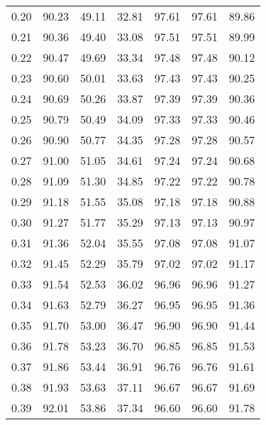 \begin{tabular}{|c|c|c|c|c|c|c|}
      0.20 &     90.23 &     49.11 &      32.81 &   97.61 &      97.61 &         89.86 \\
      0.21 &     90.36 &     49.40 &      33.08 &   97.51 &      97.51 &         89.99 \\
      0.22 &     90.47 &     49.69 &      33.34 &   97.48 &      97.48 &         90.12 \\
      0.23 &     90.60 &     50.01 &      33.63 &   97.43 &      97.43 &         90.25 \\
      0.24 &     90.69 &     50.26 &      33.87 &   97.39 &      97.39 &         90.36 \\
      0.25 &     90.79 &     50.49 &      34.09 &   97.33 &      97.33 &         90.46 \\
      0.26 &     90.90 &     50.77 &      34.35 &   97.28 &      97.28 &         90.57 \\
      0.27 &     91.00 &     51.05 &      34.61 &   97.24 &      97.24 &         90.68 \\
      0.28 &     91.09 &     51.30 &      34.85 &   97.22 &      97.22 &         90.78 \\
      0.29 &     91.18 &     51.55 &      35.08 &   97.18 &      97.18 &         90.88 \\
      0.30 &     91.27 &     51.77 &      35.29 &   97.13 &      97.13 &         90.97 \\
      0.31 &     91.36 &     52.04 &      35.55 &   97.08 &      97.08 &         91.07 \\
      0.32 &     91.45 &     52.29 &      35.79 &   97.02 &      97.02 &         91.17 \\
      0.33 &     91.54 &     52.53 &      36.02 &   96.96 &      96.96 &         91.27 \\
      0.34 &     91.63 &     52.79 &      36.27 &   96.95 &      96.95 &         91.36 \\
      0.35 &     91.70 &     53.00 &      36.47 &   96.90 &      96.90 &         91.44 \\
      0.36 &     91.78 &     53.23 &      36.70 &   96.85 &      96.85 &         91.53 \\
      0.37 &     91.86 &     53.44 &      36.91 &   96.76 &      96.76 &         91.61 \\
      0.38 &     91.93 &     53.63 &      37.11 &   96.67 &      96.67 &         91.69 \\
      0.39 &     92.01 &     53.86 &      37.34 &   96.60 &      96.60 &         91.78 \\

\end{tabular}
